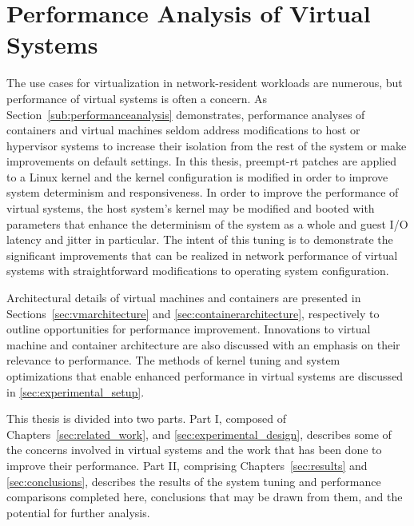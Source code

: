 \section{Performance Analysis of Virtual Systems} %
\label{sec:introperformanceanalysis}
The use cases for virtualization in network-resident workloads are numerous, but performance of virtual systems is often a concern.
As Section~\ref{sub:performanceanalysis} demonstrates, performance analyses of containers and virtual machines seldom address modifications to host or hypervisor systems to increase their isolation from the rest of the system or make improvements on default settings.  
In this thesis, preempt-rt patches are applied to a Linux kernel and the kernel configuration is modified in order to improve system determinism and responsiveness. 
In order to improve the performance of virtual systems, the host system's kernel may be modified and booted with parameters that enhance the determinism of the system as a whole and guest I/O latency and jitter in particular.
The intent of this tuning is to demonstrate the significant improvements that can be realized in network performance of virtual systems with straightforward modifications to operating system configuration.

Architectural details of virtual machines and containers are presented in Sections~\ref{sec:vmarchitecture} and \ref{sec:containerarchitecture}, respectively to outline opportunities for performance improvement.  
Innovations to virtual machine and container architecture are also discussed with an emphasis on their relevance to performance.
The methods of kernel tuning and system optimizations that enable enhanced performance in virtual systems are discussed in \ref{sec:experimental_setup}.

This thesis is divided into two parts.
Part I, composed of Chapters~\ref{sec:related_work}, and \ref{sec:experimental_design}, describes some of the concerns involved in virtual systems and the work that has been done to improve their performance.
Part II, comprising Chapters~\ref{sec:results} and \ref{sec:conclusions}, describes the results of the system tuning and performance comparisons completed here, conclusions that may be drawn from them, and the potential for further analysis.
